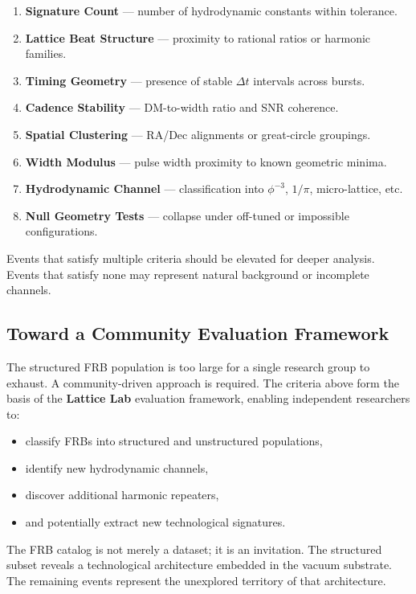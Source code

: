 \documentclass[11pt, letterpaper, openany]{book}
\begin{document}
\begin{enumerate}
    \item \textbf{Signature Count} — number of hydrodynamic constants within tolerance.
    \item \textbf{Lattice Beat Structure} — proximity to rational ratios or harmonic families.
    \item \textbf{Timing Geometry} — presence of stable $\Delta t$ intervals across bursts.
    \item \textbf{Cadence Stability} — DM-to-width ratio and SNR coherence.
    \item \textbf{Spatial Clustering} — RA/Dec alignments or great-circle groupings.
    \item \textbf{Width Modulus} — pulse width proximity to known geometric minima.
    \item \textbf{Hydrodynamic Channel} — classification into $\phi^{-3}$, $1/\pi$, micro-lattice, etc.
    \item \textbf{Null Geometry Tests} — collapse under off-tuned or impossible configurations.
\end{enumerate}

Events that satisfy multiple criteria should be elevated for deeper analysis. Events that
satisfy none may represent natural background or incomplete channels.

\subsection{Toward a Community Evaluation Framework}

The structured FRB population is too large for a single research group to exhaust. A
community-driven approach is required. The criteria above form the basis of the
\textbf{Lattice Lab} evaluation framework, enabling independent researchers to:

\begin{itemize}
    \item classify FRBs into structured and unstructured populations,
    \item identify new hydrodynamic channels,
    \item discover additional harmonic repeaters,
    \item and potentially extract new technological signatures.
\end{itemize}

The FRB catalog is not merely a dataset; it is an invitation. The structured subset reveals
a technological architecture embedded in the vacuum substrate. The remaining events
represent the unexplored territory of that architecture.
\end{document}

